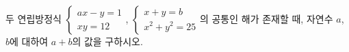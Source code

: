 두 연립방정식 $\begin{cases} ax-y=1 \\ xy=12 \end{cases}$, $\begin{cases} x+y=b \\ x^2+y^2=25 \end{cases}$의 공통인 해가 존재할 때, 자연수 $a$, $b$에 대하여 $a+b$의 값을 구하시오.
